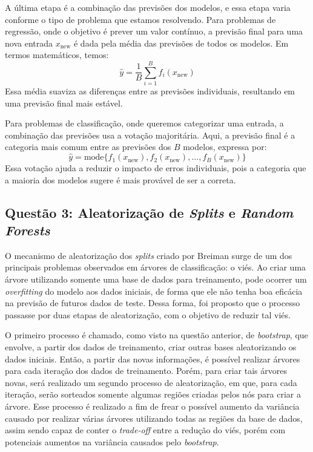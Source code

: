 \documentclass[a4paper,12pt]{article}[abntex2]
\begin{document}
A última etapa é a combinação das previsões dos modelos, e essa etapa varia conforme o tipo de problema que estamos resolvendo. Para problemas de regressão, onde o objetivo é prever um valor contínuo, a previsão final para uma nova entrada \( x_{\text{new}} \) é dada pela média das previsões de todos os modelos. Em termos matemáticos, temos:
\[
\hat{y} = \frac{1}{B} \sum_{i=1}^{B} f_i(x_{\text{new}})
\]
Essa média suaviza as diferenças entre as previsões individuais, resultando em uma previsão final mais estável.

Para problemas de classificação, onde queremos categorizar uma entrada, a combinação das previsões usa a votação majoritária. Aqui, a previsão final é a categoria mais comum entre as previsões dos \( B \) modelos, expressa por:
\[
\hat{y} = \text{mode}\{f_1(x_{\text{new}}), f_2(x_{\text{new}}), \ldots, f_B(x_{\text{new}})\}
\]
Essa votação ajuda a reduzir o impacto de erros individuais, pois a categoria que a maioria dos modelos sugere é mais provável de ser a correta.

\newpage
\subsection*{Questão 3: Aleatorização de \textit{Splits} e \textit{Random Forests}}

O mecanismo de aleatorização dos \textit{splits} criado por Breiman surge de um dos principais problemas observados em árvores de classificação: o viés. Ao criar uma árvore utilizando somente uma base de dados para treinamento, pode ocorrer um \textit{overfitting} do modelo aos dados iniciais, de forma que ele não tenha boa eficácia na previsão de futuros dados de teste. Dessa forma, foi proposto que o processo passasse por duas etapas de aleatorização, com o objetivo de reduzir tal viés.

O primeiro processo é chamado, como visto na questão anterior, de \textit{bootstrap}, que envolve, a partir dos dados de treinamento, criar outras bases aleatorizando os dados iniciais. Então, a partir das novas informações, é possível realizar árvores para cada iteração dos dados de treinamento. Porém, para criar tais árvores novas, será realizado um segundo processo de aleatorização, em que, para cada iteração, serão sorteados somente algumas regiões criadas pelos nós para criar a árvore. Esse processo é realizado a fim de frear o possível aumento da variância causado por realizar várias árvores utilizando todas as regiões da base de dados, assim sendo capaz de conter o \textit{trade-off} entre a redução do viés, porém com potenciais aumentos na variância causados pelo \textit{bootstrap}.
\end{document}
